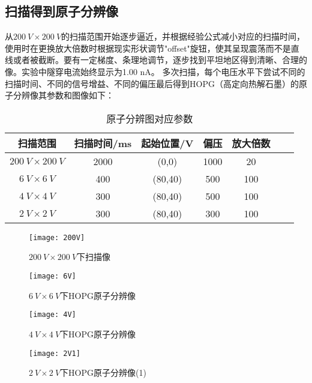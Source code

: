\documentclass[aps,pre,12pt,preprint,onecolumn,showpacs,showkeys]{revtex4-1}
\begin{document}
\subsection{扫描得到原子分辨像}
从$200\ V\times200\ V$的扫描范围开始逐步逼近，并根据经验公式减小对应的扫描时间，使用时在更换放大倍数时根据现实形状调节"offset"旋钮，使其呈现震荡而不是直线或者被截断。要有一定梯度、条理地调节，逐步找到平坦地区得到清晰、合理的像。实验中隧穿电流始终显示为1.00 nA。
多次扫描，每个电压水平下尝试不同的扫描时间、不同的信号增益、不同的偏压最后得到HOPG（高定向热解石墨）的原子分辨像其参数和图像如下：
\begin{table}[!h]
	\caption{原子分辨图对应参数}
	\begin{ruledtabular}
		\begin{tabular}{ccccccc}
			
			扫描范围 &  扫描时间/ms  & 起始位置/V & 偏压  & 放大倍数\\
			\hline
            $200\ V \times200\ V$ & 2000 & (0,0) & 1000& 20\\
            $6\ V \times6\ V$ & 400 & (80,40) & 500& 100\\
            $4\ V \times4\ V$ & 300 & (80,40) & 500& 100\\
            $2\ V \times2\ V$ & 300 & (80,40) & 300& 100\\

			
		\end{tabular}
	\end{ruledtabular}
	\label{tab:表4}
\end{table}

\begin{figure}[H]
\centering
\texttt{[image: 200V]}
\centering
\caption{\label{fig:图3}%
$200\ V\times200\ V$下扫描像}
\end{figure}

\begin{figure}[H]
\centering
\texttt{[image: 6V]}
\centering
\caption{\label{fig:图4}%
$6\ V\times6\ V$下HOPG原子分辨像}
\end{figure}

\begin{figure}[H]
\centering
\texttt{[image: 4V]}
\centering
\caption{\label{fig:图5}%
$4\ V\times4\ V$下HOPG原子分辨像}
\end{figure}

\begin{figure}[H]
\centering
\texttt{[image: 2V1]}
\centering
\caption{\label{fig:图6}%
$2\ V\times2\ V$下HOPG原子分辨像(1)}
\end{figure}
\end{document}
